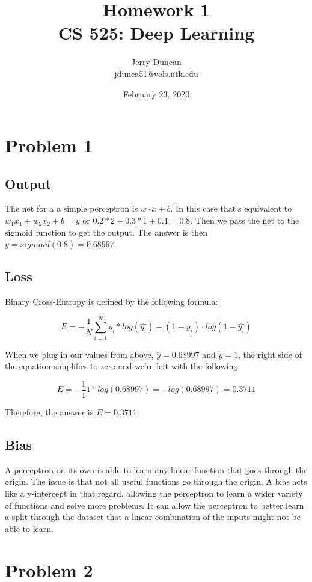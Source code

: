 \documentclass[12pt]{article}
\title{Homework 1 \\\vspace{1em}
\large CS 525: Deep Learning}
\author{
  Jerry Duncan \\
  jdunca51@vols.utk.edu
}
\date{February 23, 2020}
\begin{document}
\maketitle
\pagebreak

\section{Problem 1}

\subsection{Output}

The net for a a simple perceptron is $w \cdot x + b$.
In this case that's equivalent to $w_1x_1 + w_2x_2 + b = y$ or $0.2*2 + 0.3*1 + 0.1 = 0.8$.
Then we pass the net to the sigmoid function to get the output.
The answer is then $y = sigmoid(0.8) = 0.68997$.

\subsection{Loss}

Binary Cross-Entropy is defined by the following formula:

$$
E = - \frac{1}{N} \sum_{i=1}^{N} y_i * log(\hat{y_i}) + (1 - y_i) \cdot log(1 - \hat{y_i})
$$

When we plug in our values from above, $\hat{y} = 0.68997$ and $y = 1$,
the right side of the equation simplifies to zero and we're left with the following:

$$
E = - \frac{1}{1} 1 * log(0.68997) = -log(0.68997) = 0.3711
$$

Therefore, the answer is $E = 0.3711$.

\subsection{Bias}

A perceptron on its own is able to learn any linear function that goes through the origin.
The issue is that not all useful functions go through the origin.
A bias acts like a y-intercept in that regard, allowing the perceptron to learn a wider variety of functions
 and solve more problems.
It can allow the perceptron to better learn a split through the dataset that
 a linear combination of the inputs might not be able to learn.

\section{Problem 2}
\end{document}
